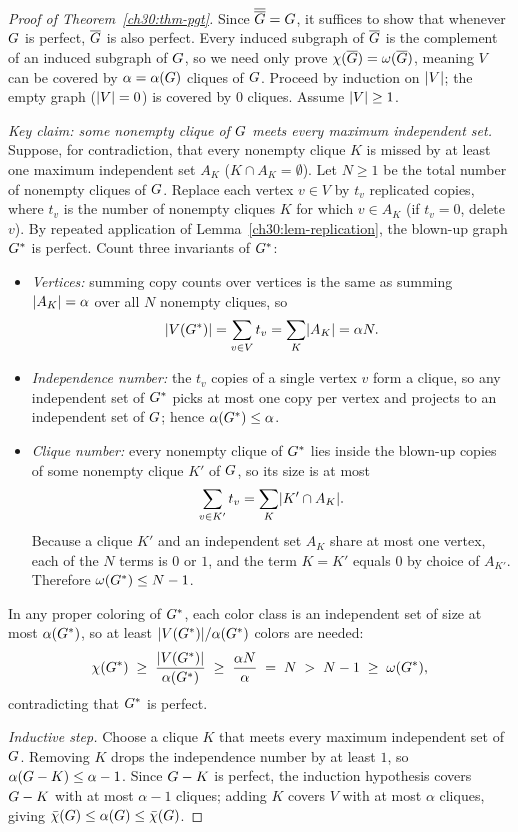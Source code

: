 \begin{proof}[Proof of Theorem~\ref{ch30:thm-pgt}]
Since $\overline{\overline{G}}=G$, it suffices to show that whenever $G$ is perfect, $\overline{G}$ is also perfect. Every induced subgraph of $\overline{G}$ is the complement of an induced subgraph of $G$, so we need only prove $\chi(\overline{G})=\omega(\overline{G})$, meaning $V$ can be covered by $\alpha=\alpha(G)$ cliques of $G$. Proceed by induction on $\lvert V\rvert$; the empty graph ($\lvert V\rvert=0$) is covered by $0$ cliques. Assume $\lvert V\rvert\ge 1$.

\emph{Key claim: some nonempty clique of $G$ meets every maximum independent set.} Suppose, for contradiction, that every nonempty clique $K$ is missed by at least one maximum independent set $A_K$ ($K\cap A_K=\emptyset$). Let $N\ge 1$ be the total number of nonempty cliques of $G$. Replace each vertex $v\in V$ by $t_v$ replicated copies, where $t_v$ is the number of nonempty cliques $K$ for which $v\in A_K$ (if $t_v=0$, delete $v$). By repeated application of Lemma~\ref{ch30:lem-replication}, the blown-up graph $G^\ast$ is perfect. Count three invariants of $G^\ast$:
\begin{itemize}
  \item \emph{Vertices:} summing copy counts over vertices is the same as summing $\lvert A_K\rvert=\alpha$ over all $N$ nonempty cliques, so
  \[
    \lvert V(G^\ast)\rvert = \sum_{v\in V} t_v = \sum_{K} \lvert A_K\rvert = \alpha N.
  \]
  \item \emph{Independence number:} the $t_v$ copies of a single vertex $v$ form a clique, so any independent set of $G^\ast$ picks at most one copy per vertex and projects to an independent set of $G$; hence $\alpha(G^\ast)\le\alpha$.
  \item \emph{Clique number:} every nonempty clique of $G^\ast$ lies inside the blown-up copies of some nonempty clique $K'$ of $G$, so its size is at most
  \[
    \sum_{v\in K'} t_v = \sum_{K} \lvert K'\cap A_K\rvert.
  \]
  Because a clique $K'$ and an independent set $A_K$ share at most one vertex, each of the $N$ terms is $0$ or $1$, and the term $K=K'$ equals $0$ by choice of $A_{K'}$. Therefore $\omega(G^\ast)\le N-1$.
\end{itemize}
In any proper coloring of $G^\ast$, each color class is an independent set of size at most $\alpha(G^\ast)$, so at least $\lvert V(G^\ast)\rvert/\alpha(G^\ast)$ colors are needed:
\[
  \chi(G^\ast) \;\ge\; \frac{\lvert V(G^\ast)\rvert}{\alpha(G^\ast)} \;\ge\; \frac{\alpha N}{\alpha} \;=\; N \;>\; N-1 \;\ge\; \omega(G^\ast),
\]
contradicting that $G^\ast$ is perfect.

\emph{Inductive step.} Choose a clique $K$ that meets every maximum independent set of $G$. Removing $K$ drops the independence number by at least $1$, so $\alpha(G-K)\le\alpha-1$. Since $G-K$ is perfect, the induction hypothesis covers $G-K$ with at most $\alpha-1$ cliques; adding $K$ covers $V$ with at most $\alpha$ cliques, giving $\bar\chi(G)\le\alpha(G)\le\bar\chi(G)$.
\end{proof}

